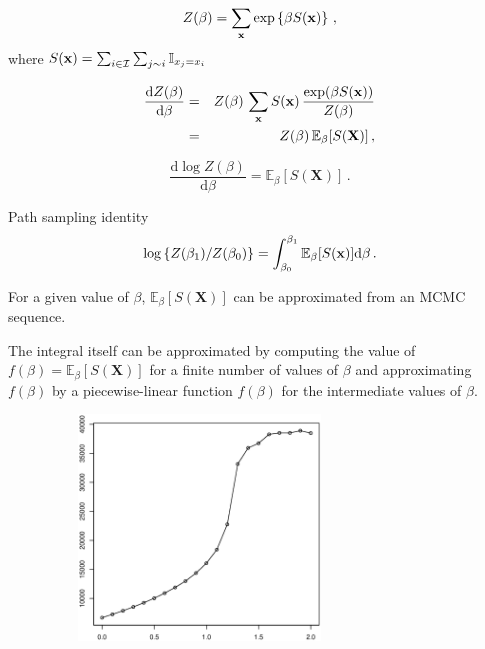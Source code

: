 \begin{slide}
\end{slide}\begin{slide}

$$
Z(\beta)=\sum_{\mathbf{x}}\exp\left\{ \beta S(\mathbf{x}) \right\}\,,
$$
where $S(\mathbf{x})=\sum_{i\in\mathcal{I}}\sum_{j\sim i} \mathbb{I}_{x_j=x_i}$

\vs \pause  
\begin{eqnarray*}
\frac{\text{d}Z(\beta)}{\text{d}\beta} & = & Z(\beta)\,\sum_{\mathbf{x}} S(\mathbf{x})\,\frac{\exp(\beta S(\mathbf{x}))}{Z(\beta)} \\
                                       & = & Z(\beta)\,\mathbb{E}_{\beta}[S(\mathbf{X})]\,,
\end{eqnarray*}

\pause
$$
\frac{\text{d} \log Z(\beta)}{\text{d}\beta} = \mathbb{E}_{\beta}[S(\mathbf{X})]\,.
$$

\end{slide}\begin{slide}

Path sampling identity
$$
\log\left\{ Z(\beta_1)/Z(\beta_0)\right\}=
\int_{\beta_0}^{\beta_1} \mathbb{E}_{\beta}[S(\mathbf{x})]\text{d}\beta\,.
$$

\end{slide}\begin{slide}

For a given value of $\beta$, $\mathbb{E}_{\beta}[S(\mathbf{X})]$ can be approximated from an MCMC sequence.

\vs \pause The integral itself can be approximated
by computing the value of $f(\beta)=\mathbb{E}_{\beta}[S(\mathbf{X})]$ for a finite number of
values of $\beta$ and approximating $f(\beta)$ by a piecewise-linear
function $\hat{f}(\beta)$ for the intermediate values of $\beta$.

\end{slide}\begin{slide}

\begin{figure}
\begin{center}
\includegraphics[width=8cm,height=6cm]{figures/pathsampling.eps}
\end{center}
\end{figure}


\end{slide}
